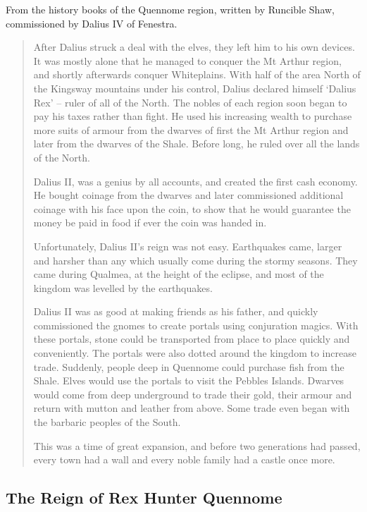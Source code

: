 \begin{multicols}{2}
From the history books of the Quennome region, written by Runcible Shaw, commissioned by Dalius IV of Fenestra.

\begin{quotation}

	After Dalius struck a deal with the elves, they left him to his own devices.
	It was mostly alone that he managed to conquer the Mt Arthur region, and shortly afterwards conquer Whiteplains.
	With half of the area North of the Kingsway mountains under his control, Dalius declared himself `Dalius Rex' -- ruler of all of the North.
	The nobles of each region soon began to pay his taxes rather than fight.
	He used his increasing wealth to purchase more suits of armour from the dwarves of first the Mt Arthur region and later from the dwarves of the Shale.
	Before long, he ruled over all the lands of the North.

	Dalius II, was a genius by all accounts, and created the first cash economy.
	He bought coinage from the dwarves and later commissioned additional coinage with his face upon the coin, to show that he would guarantee the money be paid in food if ever the coin was handed in.

	Unfortunately, Dalius II's reign was not easy.
	Earthquakes came, larger and harsher than any which usually come during the stormy seasons.
	They came during Qualmea, at the height of the eclipse, and most of the kingdom was levelled by the earthquakes.

	Dalius II was as good at making friends as his father, and quickly commissioned the gnomes to create portals using conjuration magics.
	With these portals, stone could be transported from place to place quickly and conveniently.
	The portals were also dotted around the kingdom to increase trade.
	Suddenly, people deep in Quennome could purchase fish from the Shale.
	Elves would use the portals to visit the Pebbles Islands.
	Dwarves would come from deep underground to trade their gold, their armour and return with mutton and leather from above.
	Some trade even began with the barbaric peoples of the South.

	This was a time of great expansion, and before two generations had passed, every town had a wall and every noble family had a castle once more.

\end{quotation}

\subsection{The Reign of Rex Hunter Quennome}


\end{multicols}

